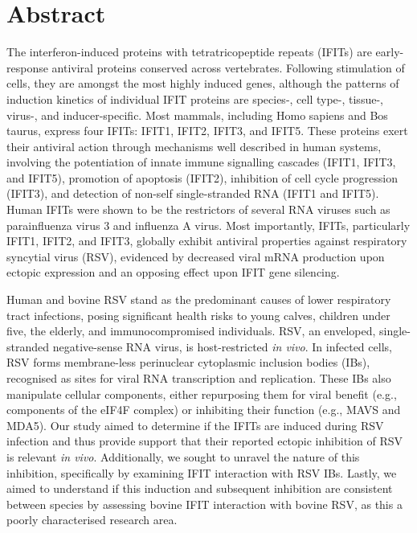 \chapter{Abstract}
The interferon-induced proteins with tetratricopeptide repeats (IFITs) are early-response antiviral proteins conserved across vertebrates. Following stimulation of cells, they are amongst the most highly induced genes, although the patterns of induction kinetics of individual IFIT proteins are species-, cell type-, tissue-, virus-, and inducer-specific. Most mammals, including Homo sapiens and Bos taurus, express four IFITs: IFIT1, IFIT2, IFIT3, and IFIT5. These proteins exert their antiviral action through mechanisms well described in human systems, involving the potentiation of innate immune signalling cascades (IFIT1, IFIT3, and IFIT5), promotion of apoptosis (IFIT2), inhibition of cell cycle progression (IFIT3), and detection of non-self single-stranded RNA (IFIT1 and IFIT5). Human IFITs were shown to be the restrictors of several RNA viruses such as parainfluenza virus 3 and influenza A virus. Most importantly, IFITs, particularly IFIT1, IFIT2, and IFIT3, globally exhibit antiviral properties against respiratory syncytial virus (RSV), evidenced by decreased viral mRNA production upon ectopic expression and an opposing effect upon IFIT gene silencing.

Human and bovine RSV stand as the predominant causes of lower respiratory tract infections, posing significant health risks to young calves, children under five, the elderly, and immunocompromised individuals. RSV, an enveloped, single-stranded negative-sense RNA virus, is host-restricted \textit{in vivo}. In infected cells, RSV forms membrane-less perinuclear cytoplasmic inclusion bodies (IBs), recognised as sites for viral RNA transcription and replication. These IBs also manipulate cellular components, either repurposing them for viral benefit (e.g., components of the eIF4F complex) or inhibiting their function (e.g., MAVS and MDA5). Our study aimed to determine if the IFITs are induced during RSV infection and thus provide support that their reported ectopic inhibition of RSV is relevant \textit{in vivo}. Additionally, we sought to unravel the nature of this inhibition, specifically by examining IFIT interaction with RSV IBs. Lastly, we aimed to understand if this induction and subsequent inhibition are consistent between species by assessing bovine IFIT interaction with bovine RSV, as this a poorly characterised research area.

